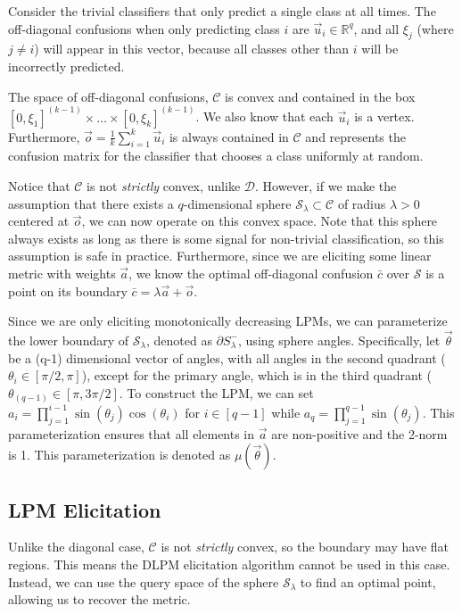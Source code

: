 \documentclass[
  letterpaper,
  numbers=noenddot,
  DIV=11,
  oneside]{scrreprt}
\theoremstyle{remark}
\begin{document}
Consider the trivial classifiers that only predict a single class at all
times. The off-diagonal confusions when only predicting class \(i\) are
\(\vec{u}_i \in \mathbb{R}^q\), and all \(\xi_j\) (where \(j \neq i\))
will appear in this vector, because all classes other than \(i\) will be
incorrectly predicted.

The space of off-diagonal confusions, \(\mathcal{C}\) is convex and
contained in the box
\([0, \xi_1]^{(k-1)} \times \dots \times [0, \xi_k]^{(k-1)}\). We also
know that each \(\vec{u}_i\) is a vertex. Furthermore,
\(\vec{o} = \frac{1}{k} \sum_{i=1}^k \vec{u}_i\) is always contained in
\(\mathcal{C}\) and represents the confusion matrix for the classifier
that chooses a class uniformly at random.

Notice that \(\mathcal{C}\) is not \emph{strictly} convex, unlike
\(\mathcal{D}\). However, if we make the assumption that there exists a
\(q\)-dimensional sphere \(\mathcal{S}_\lambda \subset \mathcal{C}\) of
radius \(\lambda > 0\) centered at \(\vec{o}\), we can now operate on
this convex space. Note that this sphere always exists as long as there
is some signal for non-trivial classification, so this assumption is
safe in practice. Furthermore, since we are eliciting some linear metric
with weights \(\vec{a}\), we know the optimal off-diagonal confusion
\(\bar{c}\) over \(\mathcal{S}\) is a point on its boundary
\(\bar{c} = \lambda \vec{a} + \vec{o}\).

Since we are only eliciting monotonically decreasing LPMs, we can
parameterize the lower boundary of \(\mathcal{S}_\lambda\), denoted as
\(\partial S^{-}_\lambda\), using sphere angles. Specifically, let
\(\vec{\theta}\) be a (q-1) dimensional vector of angles, with all
angles in the second quadrant (\(\theta_i \in [\pi/2, \pi]\)), except
for the primary angle, which is in the third quadrant
(\(\theta_{(q-1)} \in [\pi, 3\pi/2]\). To construct the LPM, we can set
\(a_i = \prod_{j=1}^{i-1} \sin(\theta_j) \cos(\theta_i)\) for
\(i \in [q-1]\) while \(a_q =  \prod_{j=1}^{q-1} \sin(\theta_j)\). This
parameterization ensures that all elements in \(\vec{a}\) are
non-positive and the 2-norm is 1. This parameterization is denoted as
\(\mu(\vec{\theta})\).

\subsection{LPM Elicitation}\label{lpm-elicitation}

Unlike the diagonal case, \(\mathcal{C}\) is not \emph{strictly} convex,
so the boundary may have flat regions. This means the DLPM elicitation
algorithm cannot be used in this case. Instead, we can use the query
space of the sphere \(\mathcal{S}_\lambda\) to find an optimal point,
allowing us to recover the metric.
\end{document}
